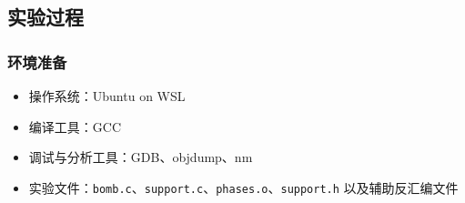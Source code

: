 \documentclass[supercite]{Experimental_Report}
\theoremstyle{definition}
\begin{document}
\subsection{实验过程}
\subsubsection{环境准备}
\begin{itemize}
  \item 操作系统：Ubuntu on WSL
  \item 编译工具：GCC
  \item 调试与分析工具：GDB、objdump、nm
  \item 实验文件：\texttt{bomb.c}、\texttt{support.c}、\texttt{phases.o}、\texttt{support.h} 以及辅助反汇编文件
\end{itemize}
\end{document}
